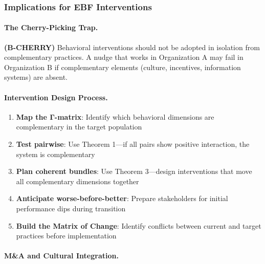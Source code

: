\subsubsection{Implications for EBF Interventions}

\paragraph{The Cherry-Picking Trap.}

\begin{axiom}
\label{ax:B-CHERRY}
\textbf{(B-CHERRY)} Behavioral interventions should not be adopted in isolation 
from complementary practices. A nudge that works in Organization A may fail in 
Organization B if complementary elements (culture, incentives, information systems) 
are absent.
\end{axiom}

\paragraph{Intervention Design Process.}

\begin{enumerate}
    \item \textbf{Map the Γ-matrix}: Identify which behavioral dimensions are 
    complementary in the target population
    
    \item \textbf{Test pairwise}: Use Theorem 1---if all pairs show positive 
    interaction, the system is complementary
    
    \item \textbf{Plan coherent bundles}: Use Theorem 3---design interventions 
    that move all complementary dimensions together
    
    \item \textbf{Anticipate worse-before-better}: Prepare stakeholders for 
    initial performance dips during transition
    
    \item \textbf{Build the Matrix of Change}: Identify conflicts between current 
    and target practices before implementation
\end{enumerate}

\paragraph{M\&A and Cultural Integration.}

